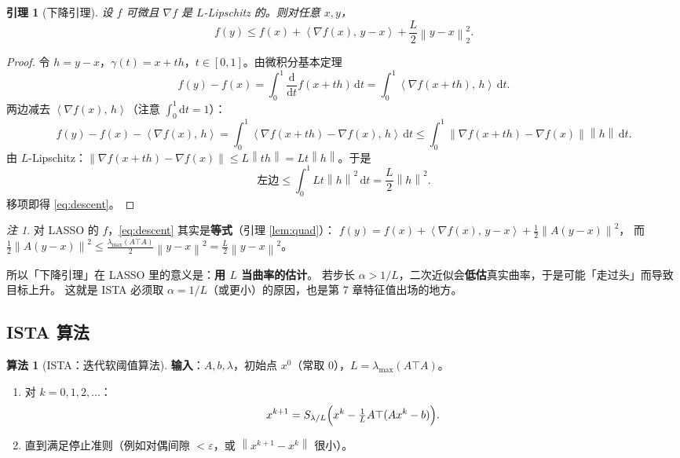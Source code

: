\documentclass[11pt,a4paper,UTF8]{ctexart}
\theoremstyle{plain}
\newtheorem{lemma}[theorem]{引理}
\theoremstyle{definition}
\newtheorem{algorithmbox}[theorem]{算法}
\theoremstyle{remark}
\newtheorem{remark}[theorem]{注}
\newcommand{\norm}[1]{\left\lVert #1 \right\rVert}
\newcommand{\inner}[2]{\left\langle #1,\, #2 \right\rangle}
\newcommand{\eps}{\varepsilon}
\newcommand{\dd}{\mathrm{d}}
\begin{document}
\begin{lemma}[下降引理]\label{lem:descent}
设 $f$ 可微且 $\nabla f$ 是 $L$-Lipschitz 的。则对任意 $x,y$，
\begin{equation}
f(y)\le f(x)+\inner{\nabla f(x)}{y-x}+\frac L2\norm{y-x}_2^2 .
\label{eq:descent}
\end{equation}
\end{lemma}

\begin{proof}
令 $h=y-x$，$\gamma(t)=x+th$，$t\in[0,1]$。由微积分基本定理
\[
f(y)-f(x)=\int_0^1\frac{\dd}{\dd t}f(x+th)\,\dd t=\int_0^1\inner{\nabla f(x+th)}{h}\,\dd t .
\]
两边减去 $\inner{\nabla f(x)}{h}$（注意 $\int_0^1\dd t=1$）：
\[
f(y)-f(x)-\inner{\nabla f(x)}{h}=\int_0^1\inner{\nabla f(x+th)-\nabla f(x)}{h}\,\dd t
\le\int_0^1\norm{\nabla f(x+th)-\nabla f(x)}\norm h\,\dd t .
\]
由 $L$-Lipschitz：$\norm{\nabla f(x+th)-\nabla f(x)}\le L\norm{th}=Lt\norm h$。于是
\[
\text{左边}\le\int_0^1 Lt\norm h^2\,\dd t=\frac L2\norm h^2 .
\]
移项即得 \eqref{eq:descent}。
\end{proof}

\begin{remark}
对 LASSO 的 $f$，\eqref{eq:descent} 其实是\textbf{等式}（引理 \ref{lem:quad}）：
$f(y)=f(x)+\inner{\nabla f(x)}{y-x}+\frac12\norm{A(y-x)}^2$，
而 $\frac12\norm{A(y-x)}^2\le\frac{\lambda_{\max}(A\top A)}{2}\norm{y-x}^2=\frac L2\norm{y-x}^2$。

所以「下降引理」在 LASSO 里的意义是：\textbf{用 $L$ 当曲率的估计}。
若步长 $\alpha>1/L$，二次近似会\textbf{低估}真实曲率，于是可能「走过头」而导致目标上升。
这就是 ISTA 必须取 $\alpha=1/L$（或更小）的原因，也是第 7 章特征值出场的地方。
\end{remark}

\subsection{ISTA 算法}

\begin{algorithmbox}[ISTA：迭代软阈值算法]
\textbf{输入}：$A,b,\lambda$，初始点 $x^0$（常取 $0$），$L=\lambda_{\max}(A\top A)$。
\begin{enumerate}
\item 对 $k=0,1,2,\dots$：
\[
x^{k+1}=S_{\lambda/L}\Bigl(x^k-\tfrac1L A\top(Ax^k-b)\Bigr).
\]
\item 直到满足停止准则（例如对偶间隙 $<\eps$，或 $\norm{x^{k+1}-x^k}$ 很小）。
\end{enumerate}
\end{algorithmbox}
\end{document}
